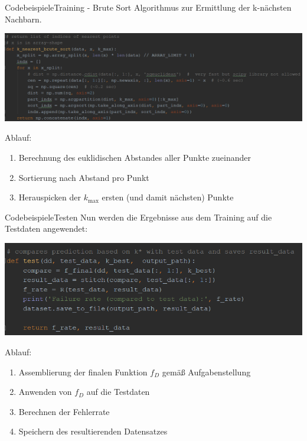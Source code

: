 \documentclass[9pt]{beamer}
\begin{document}
\begin{frame}{Codebeispiele}{Training - Brute Sort}
Algorithmus zur Ermittlung der k-nächsten Nachbarn.
\begin{center}
\includegraphics[scale=0.52]{assets/train_brute_sort_impl.png}
\end{center}
Ablauf:
\begin{enumerate}[1.]
\item{Berechnung des euklidischen Abstandes aller Punkte zueinander}
\item{Sortierung nach Abstand pro Punkt}
\item{Herauspicken der $k_\text{max}$ ersten (und damit nächsten) Punkte}
\end{enumerate}
\end{frame}

\begin{frame}{Codebeispiele}{Testen}
Nun werden die Ergebnisse aus dem Training auf die Testdaten angewendet:
\begin{center}
\includegraphics[scale=0.75]{assets/test.png}
\end{center}
Ablauf:
\begin{enumerate}[1.]
\item{Assemblierung der finalen Funktion $f_D$ gemäß Aufgabenstellung}
\item{Anwenden von $f_D$ auf die Testdaten}
\item{Berechnen der Fehlerrate}
\item{Speichern des resultierenden Datensatzes}
\end{enumerate}
\end{frame}
\end{document}
